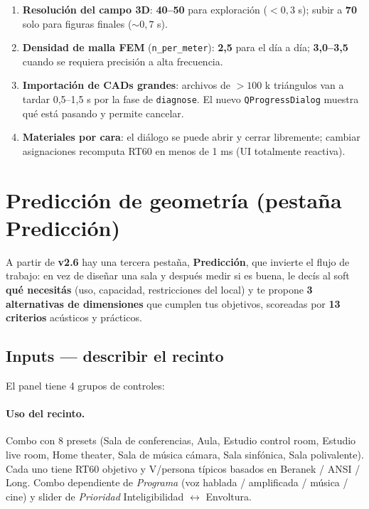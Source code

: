 \documentclass[11pt, a4paper]{article}
\begin{document}
\begin{enumerate}
  \item \textbf{Resolución del campo 3D}: \textbf{40--50} para
        exploración ($< 0{,}3$ s); subir a \textbf{70} solo para
        figuras finales ($\sim 0{,}7$ s).
  \item \textbf{Densidad de malla FEM} (\texttt{n\_per\_meter}):
        \textbf{2{,}5} para el día a día; \textbf{3{,}0--3{,}5}
        cuando se requiera precisión a alta frecuencia.
  \item \textbf{Importación de CADs grandes}: archivos de $> 100$ k
        triángulos van a tardar 0{,}5--1{,}5 s por la fase de
        \texttt{diagnose}. El nuevo \texttt{QProgressDialog} muestra
        qué está pasando y permite cancelar.
  \item \textbf{Materiales por cara}: el diálogo se puede abrir y
        cerrar libremente; cambiar asignaciones recomputa RT60 en
        menos de 1 ms (UI totalmente reactiva).
\end{enumerate}

\section{Predicción de geometría (pestaña Predicción)}

A partir de \textbf{v2.6} hay una tercera pestaña, \textbf{Predicción},
que invierte el flujo de trabajo: en vez de diseñar una sala y después
medir si es buena, le decís al soft \textbf{qué necesitás} (uso,
capacidad, restricciones del local) y te propone \textbf{3 alternativas
de dimensiones} que cumplen tus objetivos, scoreadas por
\textbf{13 criterios} acústicos y prácticos.

\subsection{Inputs --- describir el recinto}

El panel tiene 4 grupos de controles:

\paragraph{Uso del recinto.}
Combo con 8 presets (Sala de conferencias, Aula, Estudio control room,
Estudio live room, Home theater, Sala de música cámara, Sala sinfónica,
Sala polivalente). Cada uno tiene RT60 objetivo y V/persona típicos
basados en Beranek / ANSI / Long. Combo dependiente de \emph{Programa}
(voz hablada / amplificada / música / cine) y slider de
\emph{Prioridad} Inteligibilidad $\leftrightarrow$ Envoltura.
\end{document}
